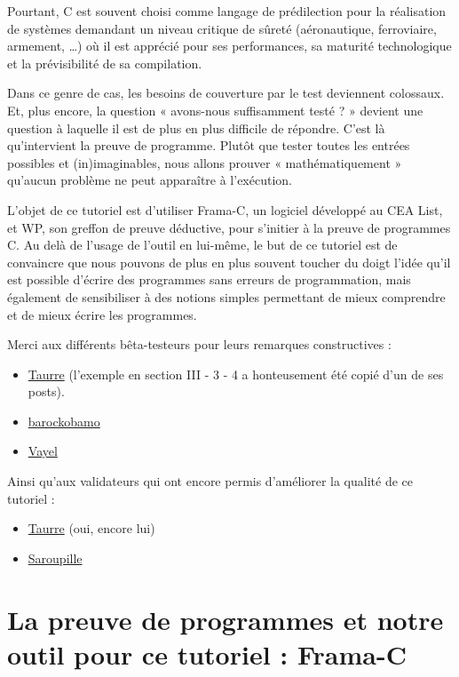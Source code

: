 \documentclass[12pt,francais,]{scrbook}
\newenvironment{zdsblock}[1]{%
  \tcolorbox[beamer,%
    noparskip,breakable,
    colback=LightBlue,colframe=DarkBlue,%
    colbacklower=DarkBlue,%
    title=#1]
}{\endtcolorbox}
\begin{document}
Pourtant, C est souvent choisi comme langage de prédilection pour la
réalisation de systèmes demandant un niveau critique de sûreté
(aéronautique, ferroviaire, armement, \ldots{}) où il est apprécié pour
ses performances, sa maturité technologique et la prévisibilité de sa
compilation.

Dans ce genre de cas, les besoins de couverture par le test deviennent
colossaux. Et, plus encore, la question « avons-nous suffisamment testé
? » devient une question à laquelle il est de plus en plus difficile de
répondre. C'est là qu'intervient la preuve de programme. Plutôt que
tester toutes les entrées possibles et (in)imaginables, nous allons
prouver « mathématiquement » qu'aucun problème ne peut apparaître à
l'exécution.

L'objet de ce tutoriel est d'utiliser Frama-C, un logiciel développé au
CEA List, et WP, son greffon de preuve déductive, pour s'initier à la
preuve de programmes C. Au delà de l'usage de l'outil en lui-même, le
but de ce tutoriel est de convaincre que nous pouvons de plus en plus
souvent toucher du doigt l'idée qu'il est possible d'écrire des
programmes sans erreurs de programmation, mais également de sensibiliser
à des notions simples permettant de mieux comprendre et de mieux écrire
les programmes.

\begin{zdsblock}{Information}
  Merci aux différents bêta-testeurs
  pour leurs remarques constructives :
  \begin{itemize}
  \item \href{https://zestedesavoir.com/membres/voir/Taurre/}{Taurre} (l'exemple
    en section III - 3 - 4 a honteusement été copié d'un de ses
    posts).
  \item \href{https://zestedesavoir.com/membres/voir/barockobamo/}{barockobamo}
  \item \href{https://zestedesavoir.com/membres/voir/Vayel/}{Vayel}
  \end{itemize}
   Ainsi qu'aux validateurs qui ont encore permis
   d'améliorer la qualité de ce tutoriel :
   \begin{itemize}
   \item \href{https://zestedesavoir.com/membres/voir/Taurre/}{Taurre} (oui,
     encore lui)
   \item \href{https://zestedesavoir.com/membres/voir/Saroupille/}{Saroupille}
   \end{itemize}
\end{zdsblock}

\chapter{La preuve de programmes et notre outil pour ce tutoriel :
Frama-C}\label{la-preuve-de-programmes-et-notre-outil-pour-ce-tutoriel-frama-c}
\end{document}
